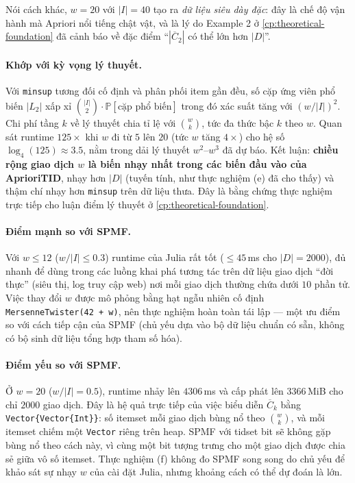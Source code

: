 Nói cách khác, $w=20$ với $|I|=40$ tạo ra \emph{dữ liệu siêu dày đặc}: đây là chế độ vận hành mà Apriori nổi tiếng chật vật, và là lý do Example 2 ở \autoref{cp:theoretical-foundation} đã cảnh báo về đặc điểm ``$|\overline{C}_2|$ có thể lớn hơn $|D|$''.

\paragraph{Khớp với kỳ vọng lý thuyết.} Với \texttt{minsup} tương đối cố định và phân phối item gần đều, số cặp ứng viên phổ biến $|L_2|$ xấp xỉ $\binom{|I|}{2} \cdot \mathbb{P}[\text{cặp phổ biến}]$ trong đó xác suất tăng với $(w/|I|)^2$. Chi phí tầng $k$ về lý thuyết chia tỉ lệ với $\binom{w}{k}$, tức đa thức bậc $k$ theo $w$. Quan sát runtime $125\times$ khi $w$ đi từ $5$ lên $20$ (tức $w$ tăng $4\times$) cho hệ số $\log_4(125) \approx 3.5$, nằm trong dải lý thuyết $w^2$--$w^3$ đã dự báo. Kết luận: \textbf{chiều rộng giao dịch $w$ là biến nhạy nhất trong các biến đầu vào của AprioriTID}, nhạy hơn $|D|$ (tuyến tính, như thực nghiệm (e) đã cho thấy) và thậm chí nhạy hơn \texttt{minsup} trên dữ liệu thưa. Đây là bằng chứng thực nghiệm trực tiếp cho luận điểm lý thuyết ở \autoref{cp:theoretical-foundation}.

\paragraph{Điểm mạnh so với SPMF.} Với $w \leq 12$ ($w/|I| \leq 0.3$) runtime của Julia rất tốt ($\leq 45$\,ms cho $|D|=2000$), đủ nhanh để dùng trong các luồng khai phá tương tác trên dữ liệu giao dịch ``đời thực'' (siêu thị, log truy cập web) nơi mỗi giao dịch thường chứa dưới $10$ phần tử. Việc thay đổi $w$ được mô phỏng bằng hạt ngẫu nhiên cố định \texttt{MersenneTwister(42 + w)}, nên thực nghiệm hoàn toàn tái lập --- một ưu điểm so với cách tiếp cận của SPMF (chủ yếu dựa vào bộ dữ liệu chuẩn có sẵn, không có bộ sinh dữ liệu tổng hợp tham số hóa).

\paragraph{Điểm yếu so với SPMF.} Ở $w=20$ ($w/|I|=0.5$), runtime nhảy lên $4306$\,ms và cấp phát lên $3366$\,MiB cho chỉ $2000$ giao dịch. Đây là hệ quả trực tiếp của việc biểu diễn $\overline{C}_k$ bằng \texttt{Vector\{Vector\{Int\}\}}: số itemset mỗi giao dịch bùng nổ theo $\binom{w}{k}$, và mỗi itemset chiếm một \texttt{Vector} riêng trên heap. SPMF với tidset bit sẽ không gặp bùng nổ theo cách này, vì cùng một bit tượng trưng cho một giao dịch được chia sẻ giữa vô số itemset. Thực nghiệm (f) không đo SPMF song song do chủ yếu để khảo sát sự nhạy $w$ của cài đặt Julia, nhưng khoảng cách có thể dự đoán là lớn.

